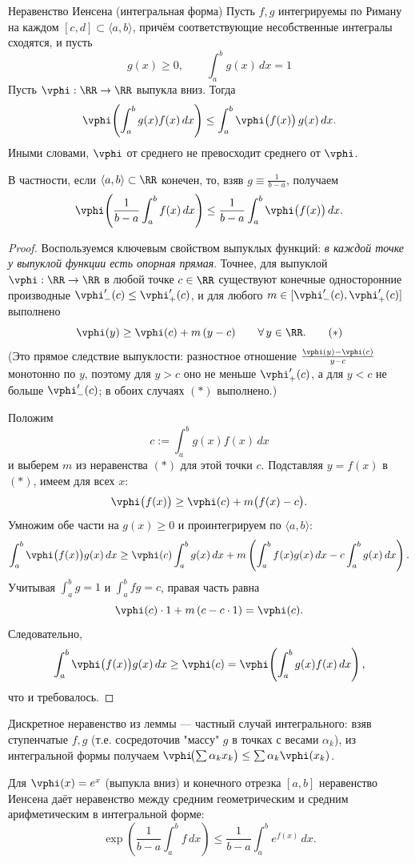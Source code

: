 \begin{Theorem}{Неравенство Иенсена (интегральная форма)}{}
	Пусть $f,g$ интегрируемы по Риману на каждом $[c,d]\subset\langle a,b\rangle$,
	причём соответствующие несобственные интегралы сходятся, и пусть
	\[
	g(x)\ge0,\qquad \int_a^b g(x)\,dx=1
	\]
	Пусть $\vphi:\RR\to\RR$ выпукла вниз.
	Тогда
	\[
	\vphi\!\left(\int_a^b g(x)f(x)\,dx\right)
	\le
	\int_a^b \vphi\bigl(f(x)\bigr)\,g(x)\,dx.
	\]
	Иными словами, $\vphi$ от среднего не превосходит среднего от $\vphi$.

	В частности, если $\langle a,b\rangle\subset\RR$ конечен, то, взяв
	$g\equiv\frac{1}{b-a}$, получаем
	\[
	\vphi\!\left(\frac{1}{b-a}\int_a^b f(x)\,dx\right)
	\le
	\frac{1}{b-a}\int_a^b \vphi\bigl(f(x)\bigr)\,dx.
	\]
\end{Theorem}

\begin{proof}
	Воспользуемся ключевым свойством выпуклых функций: \emph{в каждой точке у
	выпуклой функции есть опорная прямая}. Точнее, для выпуклой
	$\vphi:\RR\to\RR$ в любой точке $c\in\RR$ существуют конечные односторонние
	производные $\vphi'_-(c)\le\vphi'_+(c)$, и для любого
	$m\in[\vphi'_-(c),\vphi'_+(c)]$ выполнено
	\[
	\vphi(y)\ge \vphi(c)+m\,(y-c)\qquad\forall\,y\in\RR. \tag{$\ast$}
	\]
	(Это прямое следствие выпуклости: разностное отношение
	$\frac{\vphi(y)-\vphi(c)}{y-c}$ монотонно по $y$, поэтому для $y>c$ оно не
	меньше $\vphi'_+(c)$, а для $y<c$ не больше $\vphi'_-(c)$; в обоих случаях
	$(\ast)$ выполнено.)

	Положим
	\[
	c:=\int_a^b g(x)f(x)\,dx
	\]
	 и выберем $m$ из
	неравенства $(\ast)$ для этой точки $c$. Подставляя $y=f(x)$ в $(\ast)$,
	имеем для всех $x$:
	\[
	\vphi\bigl(f(x)\bigr)\ge \vphi(c)+m\bigl(f(x)-c\bigr).
	\]
	Умножим обе части на $g(x)\ge0$ и
	проинтегрируем по $\langle a,b\rangle$:
	\[
	\int_a^b \vphi\bigl(f(x)\bigr)g(x)\,dx
	\ge
	\vphi(c)\int_a^b g(x)\,dx + m\left(\int_a^b f(x)g(x)\,dx - c\int_a^b g(x)\,dx\right).
	\]
	Учитывая $\int_a^b g=1$ и $\int_a^b fg=c$, правая часть равна
	\[
	\vphi(c)\cdot1 + m\,(c-c\cdot1)=\vphi(c).
	\]
	Следовательно,
	\[
	\int_a^b \vphi\bigl(f(x)\bigr)g(x)\,dx\ge \vphi(c)
	=\vphi\!\left(\int_a^b g(x)f(x)\,dx\right),
	\]
	что и требовалось. 
\end{proof}

\begin{Remark}{}{}
	Дискретное неравенство из леммы --- частный случай интегрального: взяв
	ступенчатые $f,g$ (т.е. сосредоточив "массу" $g$ в точках с весами
	$\alpha_k$), из интегральной формы получаем
	$\vphi\!\bigl(\sum\alpha_k x_k\bigr)\le\sum\alpha_k\vphi(x_k)$.
\end{Remark}

\begin{Example}{}{}
	Для $\vphi(x)=e^{x}$ (выпукла вниз) и конечного отрезка $[a,b]$ неравенство
	Иенсена даёт неравенство между средним геометрическим и средним
	арифметическим в интегральной форме:
	\[
	\exp\!\left(\frac{1}{b-a}\int_a^b f\,dx\right)
	\le
	\frac{1}{b-a}\int_a^b e^{f(x)}\,dx.
	\]
\end{Example}

